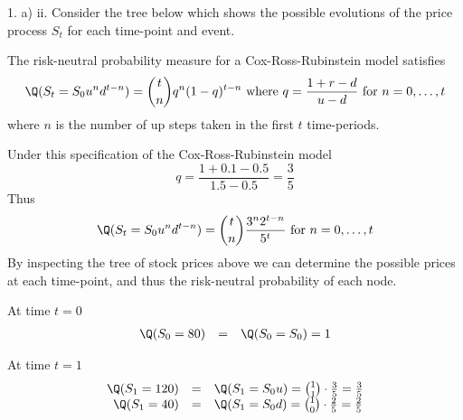 \documentclass[11pt,a4paper]{article}
\begin{document}
\begin{answer}{1. a) ii.}
  Consider the tree below which shows the possible evolutions of the price process $S_t$ for each time-point and event.
  \begin{center}
  \end{center}
  The risk-neutral probability measure for a Cox-Ross-Rubinstein model satisfies
  \[ \Q(S_t=S_0u^nd^{t-n})={t\choose n}q^n(1-q)^{t-n}\text{ where }q=\frac{1+r-d}{u-d}\text{ for }n=0,\dots,t \]
  where $n$ is the number of up steps taken in the first $t$ time-periods.
  \par Under this specification of the Cox-Ross-Rubinstein model
  \[ q=\frac{1+0.1-0.5}{1.5-0.5}=\frac35 \]
  Thus
  \[ \Q(S_t=S_0u^nd^{t-n})={t\choose n}\frac{3^n2^{t-n}}{5^t}\text{ for }n=0,\dots,t \]
  By inspecting the tree of stock prices above we can determine the possible prices at each time-point, and thus the risk-neutral probability of each node.
  \par At time $t=0$
  \[\begin{array}{rcl}
    \Q(S_0=80)&=&\Q(S_0=S_0)=1
  \end{array}\]
  \par At time $t=1$
  \[\begin{array}{rcl}
    \Q(S_1=120)&=&\Q(S_1=S_0u)
    ={1\choose1}\cdot\frac35
    =\frac35\\
    \Q(S_1=40)&=&\Q(S_1=S_0d)
    ={1\choose0}\cdot\frac25
    =\frac25
  \end{array}\]

\end{answer}
\end{document}
